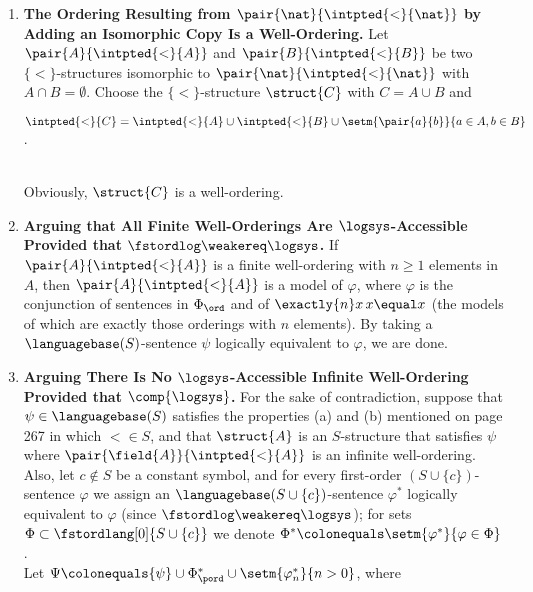 \begin{enumerate}[1.]
%
\item \textbf{The Ordering Resulting from $\pair{\nat}{{\intpted{<}{\nat}}}$ by Adding an Isomorphic Copy Is a Well-Ordering.} Let $\pair{A}{{\intpted{<}{A}}}$ and $\pair{B}{{\intpted{<}{B}}}$ be two $\{ < \}$-structures isomorphic to $\pair{\nat}{{\intpted{<}{\nat}}}$ with $A \cap B = \emptyset$. Choose the $\{ < \}$-structure $\struct{C}$ with $C = A \cup B$ and\smallskip\\
\centerline{${\intpted{<}{C}} = {\intpted{<}{A}} \cup {\intpted{<}{B}} \cup \setm{\pair{a}{b}}{a \in A, b \in B}$.}\smallskip\\
Obviously, $\struct{C}$ is a well-ordering.
%
\item \textbf{Arguing that All Finite Well-Orderings Are $\logsys$-Accessible Provided that $\fstordlog \weakereq \logsys$.} If $\pair{A}{\intpted{<}{A}}$ is a finite well-ordering with $n \geq 1$ elements in $A$, then $\pair{A}{\intpted{<}{A}}$ is a model of $\varphi$, where $\varphi$ is the conjunction of sentences in $\Phi_\ord$ and of $\exactly{n} x\, x \equal x$ (the models of which are exactly those orderings with $n$ elements). By taking a $\languagebase(S)$-sentence $\psi$ logically equivalent to $\varphi$, we are done.
%
\item \textbf{Arguing There Is No $\logsys$-Accessible Infinite Well-Ordering Provided that $\comp{\logsys}$.} For the sake of contradiction, suppose that $\psi \in \languagebase(S)$ satisfies the properties (a) and (b) mentioned on page 267 in which ${<} \in S$, and that $\struct{A}$ is an $S$-structure that satisfies $\psi$ where $\pair{\field{A}}{{\intpted{<}{A}}}$ is an infinite well-ordering. Also, let $c \not\in S$ be a constant symbol, and for every first-order $(S \cup \{ c \})$-sentence $\varphi$ we assign an $\languagebase(S \cup \{ c \})$-sentence $\varphi^\ast$ logically equivalent to $\varphi$ (since $\fstordlog \weakereq \logsys$); for sets $\Phi \subset \fstordlang[0]{S \cup \{ c \}}$ we denote $\Phi^\ast \colonequals \setm{\varphi^\ast}{\varphi \in \Phi}$.\bigskip\\
Let $\Psi \colonequals \{ \psi \} \cup \Phi_\pord^\ast \cup \setm{\varphi_n^\ast}{n > 0}$, where\smallskip\\

\end{enumerate}
